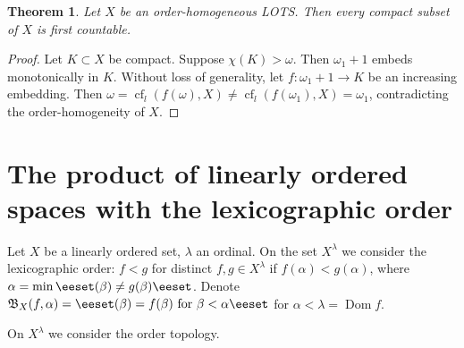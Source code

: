 \documentclass[preprint]{elsarticle}
\def\om{\omega}
\def\be{\beta}
\def\al{\alpha}
\def\ga{\gamma}
\def\la{\lambda}
\def\set#1{\bbset#1\eeset}
\def\bbset#1:#2\eeset{\{#1\,:\,#2\}}
\newtheorem{theorem}{Theorem}[section]
\theoremstyle{definition}
\theoremstyle{remark}
\def\cf{\operatorname{cf}}
\def\lex#1#2{\mathfrak{L}(#2^{#1})}
\def\lex#1#2{#2^{#1}}
\def\blex#1#2#3#4{\mathfrak{B}(#1,#2;#4^{#3})}
\def\blex#1#2#3#4{\mathfrak{B}_{#4^{#3}}(#1,#2)}
\def\blex#1#2#3#4{\mathfrak{B}_{#4}(#1,#2)}
\def\dom{\operatorname{Dom}}
\begin{document}







\begin{theorem}\label{t:cssoh:1}
Let $X$ be an order-homogeneous LOTS.
Then every compact subset of $X$ is first countable.
\end{theorem}
\begin{proof}
Let $K\subset X$ be compact. Suppose $\chi(K)>\om$. Then $\om_1+1$ embeds monotonically in $K$. Without loss of generality, let $f: \om_1+1 \to K$ be an increasing embedding. Then $\om=\cf_l(f(\om),X)\neq \cf_l(f(\om_1),X)=\om_1$, contradicting the order-homogeneity of $X$.
\end{proof}



\section{The product of linearly ordered spaces with the lexicographic order} \label{sec:lex}


Let $X$ be a linearly ordered set, $\la$ an ordinal. On the set $X^\la$ we consider the lexicographic order: $f<g$ for distinct $f,g\in X^\la$ if $f(\al)<g(\al)$, where $\al=\min \set{\be<\la: f(\be)\neq g(\be)}$. 
Denote $\blex f\al\la X=\set{g\in X^\la: g(\be)=f(\be)\text{ for }\be<\al}$ for $\al<\la=\dom f$.

On $X^\la$ we consider the order topology.
\end{document}
